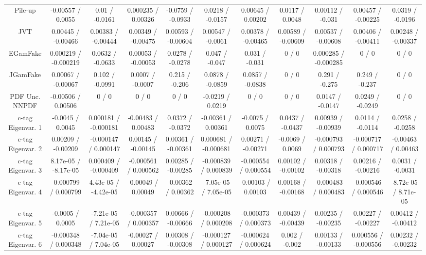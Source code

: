 \begin{table}[htbp]
\begin{center}
\begin{tabular}{|c|c|c|c|c|c|c|c|c|c|c|}
  Pile-up & -0.00557 / 0.0055 & 0.01 / -0.0161 & 0.000235 / 0.00326 & -0.0759 / -0.0933 & 0.0218 / -0.0157 & 0.00645 / 0.00202 & 0.0117 / 0.0048 & 0.00112 / -0.031 & 0.00457 / -0.00225 & 0.0319 / -0.0196 \\ 
  JVT & 0.00445 / -0.00466 & 0.00383 / -0.00444 & 0.00349 / -0.00475 & 0.00593 / -0.00604 & 0.00547 / -0.0061 & 0.00378 / -0.00465 & 0.00589 / -0.00609 & 0.00537 / -0.00608 & 0.00406 / -0.00411 & 0.00248 / -0.00337 \\ 
  EGamFake & 0.000219 / -0.000219 & 0.0632 / -0.0633 & 0.00053 / -0.00053 & 0.0278 / -0.0278 & 0.047 / -0.047 & 0.031 / -0.031 & 0 / 0 & 0.000285 / -0.000285 & 0 / 0 & 0 / 0 \\ 
  JGamFake & 0.00067 / -0.00067 & 0.102 / -0.0991 & 0.0007 / -0.0007 & 0.215 / -0.206 & 0.0878 / -0.0859 & 0.0857 / -0.0838 & 0 / 0 & 0.291 / -0.275 & 0.249 / -0.237 & 0 / 0 \\ 
  PDF Unc. NNPDF & -0.00506 / 0.00506 & 0 / 0 & 0 / 0 & 0 / 0 & -0.0219 / 0.0219 & 0 / 0 & 0 / 0 & 0.0147 / -0.0147 & 0.0249 / -0.0249 & 0 / 0 \\ 
  c-tag Eigenvar. 1 & -0.0045 / 0.0045 & 0.000181 / -0.000181 & -0.00483 / 0.00483 & 0.0372 / -0.0372 & -0.00361 / 0.00361 & -0.0075 / 0.0075 & 0.0437 / -0.0437 & 0.00939 / -0.00939 & 0.0114 / -0.0114 & 0.0258 / -0.0258 \\ 
  c-tag Eigenvar. 2 & 0.00209 / -0.00209 & -0.000147 / 0.000147 & 0.00145 / -0.00145 & 0.00361 / -0.00361 & 0.000681 / -0.000681 & 0.00271 / -0.00271 & -0.0069 / 0.0069 & -0.000793 / 0.000793 & -0.000717 / 0.000717 & -0.00463 / 0.00463 \\ 
  c-tag Eigenvar. 3 & 8.17e-05 / -8.17e-05 & 0.000409 / -0.000409 & -0.000561 / 0.000562 & 0.00285 / -0.00285 & -0.000839 / 0.000839 & -0.000554 / 0.000554 & 0.00102 / -0.00102 & 0.00318 / -0.00318 & 0.00216 / -0.00216 & 0.0031 / -0.0031 \\ 
  c-tag Eigenvar. 4 & -0.000799 / 0.000799 & 4.43e-05 / -4.42e-05 & -0.00049 / 0.00049 & -0.00362 / 0.00362 & -7.05e-05 / 7.05e-05 & -0.00103 / 0.00103 & 0.00168 / -0.00168 & -0.000483 / 0.000483 & -0.000546 / 0.000546 & -8.72e-05 / 8.71e-05 \\ 
  c-tag Eigenvar. 5 & -0.0005 / 0.0005 & -7.21e-05 / 7.21e-05 & -0.000357 / 0.000357 & 0.00666 / -0.00666 & -0.000208 / 0.000208 & -0.000373 / 0.000373 & 0.00439 / -0.00439 & 0.00235 / -0.00235 & 0.00227 / -0.00227 & 0.00412 / -0.00412 \\ 
  c-tag Eigenvar. 6 & -0.000348 / 0.000348 & -7.04e-05 / 7.04e-05 & -0.00027 / 0.00027 & 0.00308 / -0.00308 & -0.000127 / 0.000127 & -0.000624 / 0.000624 & 0.002 / -0.002 & 0.00133 / -0.00133 & 0.000556 / -0.000556 & 0.00232 / -0.00232 \\ 

\end{tabular}
\end{center}
\end{table}
